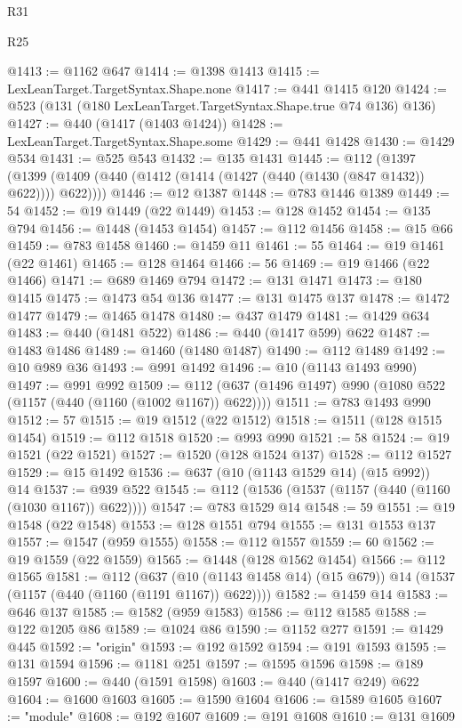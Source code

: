 \begin{lexlean}{R31}
\begin{lexlean}{R25}
\begin{coremodule}
{{{{{{{{{{{{{{{{{{{{{{{{{{{{{{{{{{{{{{{{{{{{{{{{{{{{{{{{{{{{{{{{{{{{{{{{{{{{{{{{{{{{{{{{{{{{{{{{{{{{{{{{{{{{{{{{{{{{{{{{{{{{{{{{{{{{{{{{{{{{{{{{{{{{{{{{{{{{{{{{{{{{{{{{{{{{{{{{{{{{{{{{{{{{{{{{{{{{{{{@1413 := @1162 @647
@1414 := @1398 @1413
@1415 := LexLeanTarget.TargetSyntax.Shape.none
@1417 := @441 @1415 @120
@1424 := @523 (@131 (@180 LexLeanTarget.TargetSyntax.Shape.true @74 @136) @136)
@1427 := @440 (@1417 (@1403 @1424))
@1428 := LexLeanTarget.TargetSyntax.Shape.some
@1429 := @441 @1428
@1430 := @1429 @534
@1431 := @525 @543
@1432 := @135 @1431
@1445 := @112
    (@1397 (@1399 (@1409 (@440 (@1412 (@1414 (@1427 (@440 (@1430 (@847 @1432)) @622)))) @622))))
@1446 := @12 @1387
@1448 := @783 @1446 @1389
@1449 := 54
@1452 := @19 @1449 (@22 @1449)
@1453 := @128 @1452
@1454 := @135 @794
@1456 := @1448 (@1453 @1454)
@1457 := @112 @1456
@1458 := @15 @66
@1459 := @783 @1458
@1460 := @1459 @11
@1461 := 55
@1464 := @19 @1461 (@22 @1461)
@1465 := @128 @1464
@1466 := 56
@1469 := @19 @1466 (@22 @1466)
@1471 := @689 @1469 @794
@1472 := @131 @1471
@1473 := @180 @1415
@1475 := @1473 @54 @136
@1477 := @131 @1475 @137
@1478 := @1472 @1477
@1479 := @1465 @1478
@1480 := @437 @1479
@1481 := @1429 @634
@1483 := @440 (@1481 @522)
@1486 := @440 (@1417 @599) @622
@1487 := @1483 @1486
@1489 := @1460 (@1480 @1487)
@1490 := @112 @1489
@1492 := @10 @989 @36
@1493 := @991 @1492
@1496 := @10 (@1143 @1493 @990)
@1497 := @991 @992
@1509 := @112 (@637 (@1496 @1497) @990 (@1080 @522 (@1157 (@440 (@1160 (@1002 @1167)) @622))))
@1511 := @783 @1493 @990
@1512 := 57
@1515 := @19 @1512 (@22 @1512)
@1518 := @1511 (@128 @1515 @1454)
@1519 := @112 @1518
@1520 := @993 @990
@1521 := 58
@1524 := @19 @1521 (@22 @1521)
@1527 := @1520 (@128 @1524 @137)
@1528 := @112 @1527
@1529 := @15 @1492
@1536 := @637 (@10 (@1143 @1529 @14) (@15 @992)) @14
@1537 := @939 @522
@1545 := @112 (@1536 (@1537 (@1157 (@440 (@1160 (@1030 @1167)) @622))))
@1547 := @783 @1529 @14
@1548 := 59
@1551 := @19 @1548 (@22 @1548)
@1553 := @128 @1551 @794
@1555 := @131 @1553 @137
@1557 := @1547 (@959 @1555)
@1558 := @112 @1557
@1559 := 60
@1562 := @19 @1559 (@22 @1559)
@1565 := @1448 (@128 @1562 @1454)
@1566 := @112 @1565
@1581 := @112
    (@637 (@10 (@1143 @1458 @14) (@15 @679)) @14 (@1537 (@1157 (@440 (@1160 (@1191 @1167)) @622))))
@1582 := @1459 @14
@1583 := @646 @137
@1585 := @1582 (@959 @1583)
@1586 := @112 @1585
@1588 := @122 @1205 @86
@1589 := @1024 @86
@1590 := @1152 @277
@1591 := @1429 @445
@1592 := "origin"
@1593 := @192 @1592
@1594 := @191 @1593
@1595 := @131 @1594
@1596 := @1181 @251
@1597 := @1595 @1596
@1598 := @189 @1597
@1600 := @440 (@1591 @1598)
@1603 := @440 (@1417 @249) @622
@1604 := @1600 @1603
@1605 := @1590 @1604
@1606 := @1589 @1605
@1607 := "module"
@1608 := @192 @1607
@1609 := @191 @1608
@1610 := @131 @1609
}}}}}}}}}}}}}}}}}}}}}}}}}}}}}}}}}}}}}}}}}}}}}}}}}}}}}}}}}}}}}}}}}}}}}}}}}}}}}}}}}}}}}}}}}}}}}}}}}}}}}}}}}}}}}}}}}}}}}}}}}}}}}}}}}}}}}}}}}}}}}}}}}}}}}}}}}}}}}}}}}}}}}}}}}}}}}}}}}}}}}}}}}}}}}}}}}}}}}}}
\end{coremodule}
\end{lexlean}
\end{lexlean}

